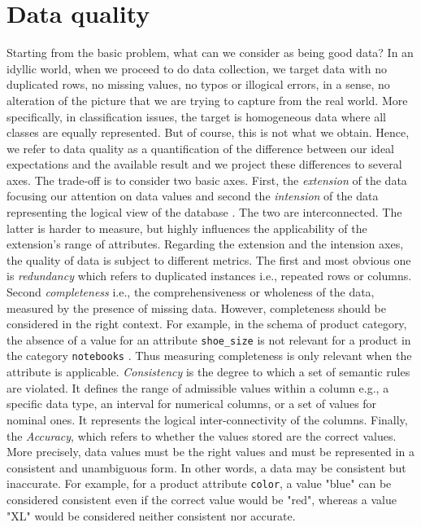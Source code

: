 \documentclass{article}
\begin{document}
\section{Data quality} %
\label{sec:Data quality}
Starting from the basic problem, what can we consider as being good data?
In an idyllic world, when we proceed to do data collection, we target data with no duplicated rows, no missing values, no typos or illogical errors, in a sense, no alteration of the picture that we are trying to capture from the real world.
More specifically, in classification issues, the target is homogeneous data where all classes are equally represented.
But of course, this is not what we obtain.
Hence, we refer to data quality as a quantification of the difference between our ideal expectations and the available result and we project these differences to several axes.
The trade-off is to consider two basic axes.
First, the \textit{extension} of the data focusing our attention on data values and second the \textit{intension} of the data representing the logical view of the database \cite{amazon}.
The two are interconnected.
The latter is harder to measure, but highly influences the applicability of the extension's range of attributes.
Regarding the extension and the intension axes, the quality of data is subject to different metrics.
The first and most obvious one is \textit{redundancy} which refers to duplicated instances i.e., repeated rows or columns.
Second \textit{completeness} i.e., the comprehensiveness or wholeness of the data, measured by the presence of missing data.
However, completeness should be considered in the right context.
For example, in the schema of product category, the absence of a value for an attribute \texttt{shoe\_size} is not relevant for a product in the category \texttt{notebooks} \cite{amazon}.
Thus measuring completeness is only relevant when the attribute is applicable.
\textit{Consistency} is the degree to which a set of semantic rules are violated.
It defines the range of admissible values within a column e.g., a specific data type, an interval for numerical columns, or a set of values for nominal ones.
It represents the logical inter-connectivity of the columns.
Finally, the \textit{Accuracy}, which refers to whether the values stored are the correct values.
More precisely, data values must be the right values and must be represented in a consistent and unambiguous form.
In other words, a data may be consistent but inaccurate.
For example, for a product attribute \texttt{color}, a value "blue" can be considered consistent even if the correct value would be "red", whereas a value "XL" would be considered neither consistent nor accurate.
\end{document}
